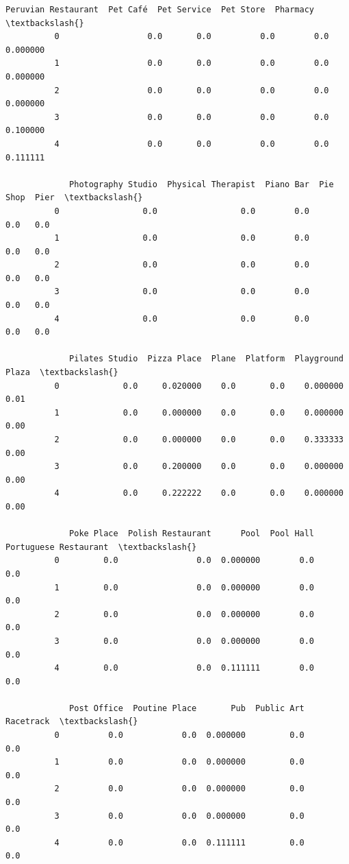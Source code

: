 \documentclass[11pt]{article}
\begin{document}
\begin{Verbatim}[commandchars=\\\{\}]
             Peruvian Restaurant  Pet Café  Pet Service  Pet Store  Pharmacy  \textbackslash{}
          0                  0.0       0.0          0.0        0.0  0.000000   
          1                  0.0       0.0          0.0        0.0  0.000000   
          2                  0.0       0.0          0.0        0.0  0.000000   
          3                  0.0       0.0          0.0        0.0  0.100000   
          4                  0.0       0.0          0.0        0.0  0.111111   
          
             Photography Studio  Physical Therapist  Piano Bar  Pie Shop  Pier  \textbackslash{}
          0                 0.0                 0.0        0.0       0.0   0.0   
          1                 0.0                 0.0        0.0       0.0   0.0   
          2                 0.0                 0.0        0.0       0.0   0.0   
          3                 0.0                 0.0        0.0       0.0   0.0   
          4                 0.0                 0.0        0.0       0.0   0.0   
          
             Pilates Studio  Pizza Place  Plane  Platform  Playground  Plaza  \textbackslash{}
          0             0.0     0.020000    0.0       0.0    0.000000   0.01   
          1             0.0     0.000000    0.0       0.0    0.000000   0.00   
          2             0.0     0.000000    0.0       0.0    0.333333   0.00   
          3             0.0     0.200000    0.0       0.0    0.000000   0.00   
          4             0.0     0.222222    0.0       0.0    0.000000   0.00   
          
             Poke Place  Polish Restaurant      Pool  Pool Hall  Portuguese Restaurant  \textbackslash{}
          0         0.0                0.0  0.000000        0.0                    0.0   
          1         0.0                0.0  0.000000        0.0                    0.0   
          2         0.0                0.0  0.000000        0.0                    0.0   
          3         0.0                0.0  0.000000        0.0                    0.0   
          4         0.0                0.0  0.111111        0.0                    0.0   
          
             Post Office  Poutine Place       Pub  Public Art  Racetrack  \textbackslash{}
          0          0.0            0.0  0.000000         0.0        0.0   
          1          0.0            0.0  0.000000         0.0        0.0   
          2          0.0            0.0  0.000000         0.0        0.0   
          3          0.0            0.0  0.000000         0.0        0.0   
          4          0.0            0.0  0.111111         0.0        0.0   
          

\end{Verbatim}
\end{document}

